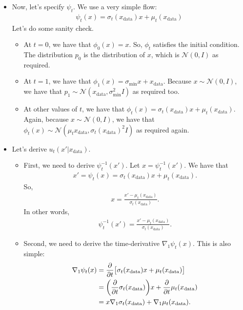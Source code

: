 \documentclass[10pt]{article}
\newcommand{\mcal}[1]{\mathcal{#1}}
\newcommand{\data}{\mathrm{data}}
\begin{document}
\begin{itemize}
  \item Now, let's specify $\psi_t$. We use a very simple flow:
  \begin{align*}
    \psi_t(x) = \sigma_t(x_{\data}) x + \mu_t(x_{\data})
  \end{align*}
  Let's do some sanity check.
  \begin{itemize}
    \item At $t = 0$, we have that $\phi_0(x) = x$. So, $\phi_t$ satisfies the initial condition. The distribution $p_0$ is the distribution of $x$, which is $\mcal{N}(0,I)$ as required.
    \item At $t = 1$, we have that $\phi_1(x) = \sigma_{\min} x + x_{\data}$. Because $x \sim \mcal{N}(0,I)$, we have that $p_1 \sim \mcal{N}(x_{\data}, \sigma_{\min}^2I)$ as required too.
    \item At other values of $t$, we have that $\phi_t(x) = \sigma_t(x_{\data}) x + \mu_t(x_{\data})$. Again, because $x \sim \mcal{N}(0,I)$, we have that $\phi_t(x) \sim \mcal{N}(\mu_t{x_{\data}},\sigma_t(x_{\data})^2 I)$ as required again.
  \end{itemize}

  \item Let's derive $u_t(x'|x_{\data})$.
  \begin{itemize}
    \item First, we need to derive $\psi^{-1}_t(x')$. Let $x = \psi^{-1}_t(x')$. We have that
    \begin{align*}
      x' = \psi_t(x) = \sigma_{t}(x_{\data}) x + \mu_t(x_{\data}).
    \end{align*}
    So,
    \begin{align*}
      x = \frac{x' - \mu_t(x_{\data})}{\sigma_t(x_{\data})}.
    \end{align*}
    In other words,
    \begin{align}
      \psi^{-1}_t(x') = \frac{x' - \mu_t(x_{\data})}{\sigma_t(x_{\data})}. \label{eqn:single-item-flow-inverse}
    \end{align}

    \item Second, we need to derive the time-derivative $\nabla_1 \psi_t(x)$. This is also simple:
    \begin{align}
      \nabla_1 \psi_t(x) 
      &= \frac{\partial}{\partial t} \big[ \sigma_t(x_{\data}) x + \mu_t(x_{\data}) \big] \notag \\
      &= \bigg( \frac{\partial}{\partial t} \sigma_t(x_{\data}) \bigg) x + \frac{\partial}{\partial t} \mu_t(x_{\data}) \notag \\
      &= x \nabla_1 \sigma_t(x_{\data}) + \nabla_1 \mu_t(x_{\data}). \label{eqn:single-item-time-deriv}
    \end{align}
  \end{itemize}


\end{itemize}
\end{document}
